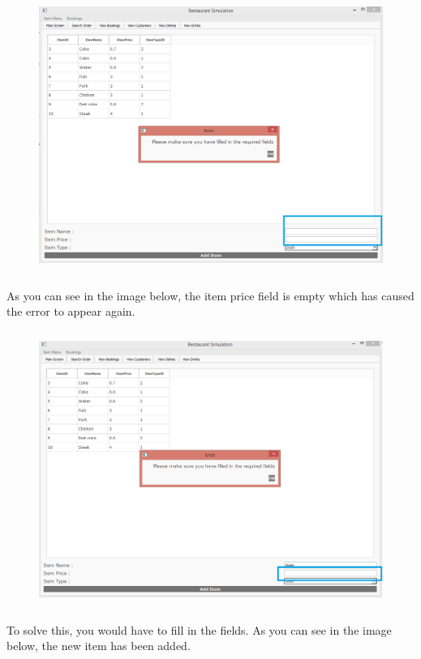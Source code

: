 \begin{figure}[H]
    \includegraphics[height = 9cm]{./Manual/images/HamError1} 
    \caption{} \label{fig:hamerror1}
\end{figure}

As you can see in the image below, the item price field is empty which has caused the error to appear again.

\begin{figure}[H]
    \includegraphics[height = 9cm]{./Manual/images/HamError2} 
    \caption{} \label{fig:hamerror2}
\end{figure}

To solve this, you would have to fill in the fields. As you can see in the image below, the new item has been added.

